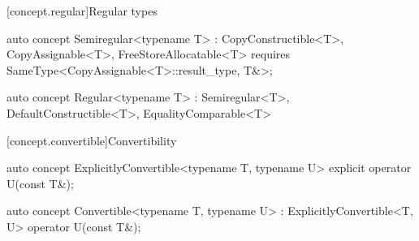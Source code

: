 \documentclass[american,twoside]{book}
\begin{document}
\begin{itemdescr}
\pnum
{}
\end{itemdescr}

[concept.regular]{Regular types}

\begin{itemdecl}
auto concept Semiregular<typename T> 
  : CopyConstructible<T>, CopyAssignable<T>, FreeStoreAllocatable<T> { 
  requires SameType<CopyAssignable<T>::result_type, T&>;
}
\end{itemdecl}

\begin{itemdescr}
\pnum 
{}
\end{itemdescr}

\begin{itemdecl}
auto concept Regular<typename T> 
  : Semiregular<T>, DefaultConstructible<T>, EqualityComparable<T> { }
\end{itemdecl}

\begin{itemdescr}
\pnum
{}
\end{itemdescr}

[concept.convertible]{Convertibility}

\begin{itemdecl}
auto concept ExplicitlyConvertible<typename T, typename U> {
  explicit operator U(const T&);
}
\end{itemdecl}

\begin{itemdescr}
\pnum
{}
\end{itemdescr}

\begin{itemdecl}
auto concept Convertible<typename T, typename U> : ExplicitlyConvertible<T, U> {
  operator U(const T&);
}
\end{itemdecl}

\begin{itemdescr}
\pnum
{}
\end{itemdescr}
\end{document}
